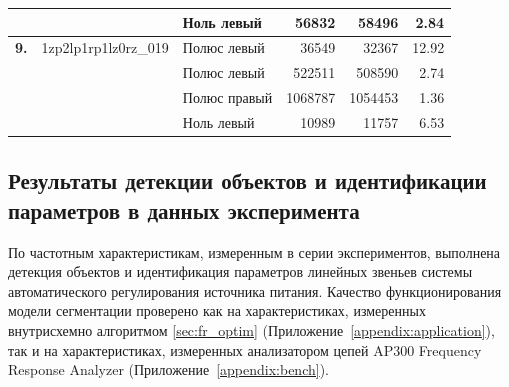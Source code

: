 \begin{table}[htbp]
\begin{threeparttable}
\begin{tabular}{|l|l|l|l|l|l|}
			& & Ноль левый & \multicolumn{1}{r|}{\num{56832}} & \multicolumn{1}{r|}{\num{58496}} & \multicolumn{1}{r|}{\num{2.84}}\\ \hline
			\textbf{9.} & 1zp2lp1rp1lz0rz\_019 & Полюс левый & \multicolumn{1}{r|}{\num{36549}} & \multicolumn{1}{r|}{\num{32367}} & \multicolumn{1}{r|}{\num{12.92}}\\ \hline
			& & Полюс левый & \multicolumn{1}{r|}{\num{522511}} & \multicolumn{1}{r|}{\num{508590}} & \multicolumn{1}{r|}{\num{2.74}}\\ \hline
			& & Полюс правый & \multicolumn{1}{r|}{\num{1068787}} & \multicolumn{1}{r|}{\num{1054453}} & \multicolumn{1}{r|}{\num{1.36}}\\ \hline
			& & Ноль левый & \multicolumn{1}{r|}{\num{10989}} & \multicolumn{1}{r|}{\num{11757}} & \multicolumn{1}{r|}{\num{6.53}}\\ \hline

        \end{tabular}
    \end{threeparttable}
\end{table}


\subsection{Результаты детекции объектов и идентификации параметров в данных эксперимента}
По частотным характеристикам, измеренным в серии экспериментов, выполнена детекция объектов и идентификация параметров линейных звеньев системы автоматического регулирования источника питания. Качество функционирования модели сегментации проверено как на характеристиках, измеренных внутрисхемно алгоритмом \ref{sec:fr_optim} (Приложение~\ref{appendix:application}), так и на характеристиках, измеренных анализатором цепей AP300 Frequency Response Analyzer (Приложение~\ref{appendix:bench}).

